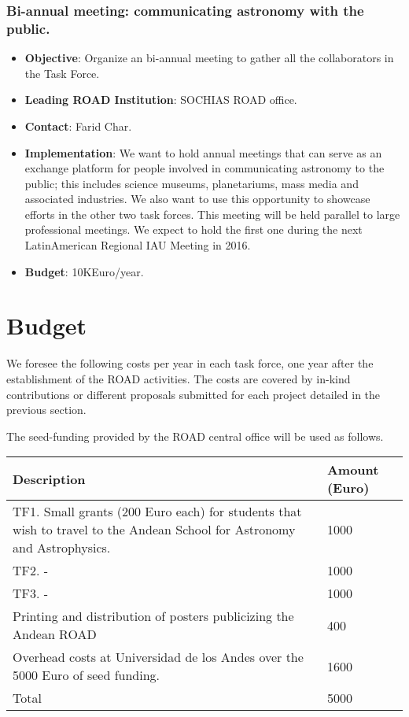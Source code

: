 \documentclass[12pt]{article}
\begin{document}
\subsubsection{Bi-annual meeting: communicating astronomy with the
  public.}
\begin{itemize}
\item {\bf Objective}: Organize an bi-annual meeting to gather all the
  collaborators in the Task Force.
\item {\bf Leading ROAD Institution}: SOCHIAS ROAD office.
\item {\bf Contact}: Farid Char.
\item {\bf Implementation}: We want to hold annual meetings that can
  serve as an exchange platform for people involved in communicating
  astronomy to the public; this includes science museums,
  planetariums, mass media and associated industries. We also want to use
  this opportunity to showcase efforts in the other two task
  forces. This meeting will be held parallel to large professional
  meetings. We expect to hold the first one during the next LatinAmerican
  Regional IAU Meeting in 2016. 
\item {\bf Budget}: 10KEuro/year.
\end{itemize}




\section{Budget}

We foresee the following costs per year in each task force, one year
after the establishment of the ROAD activities. The costs are covered
by in-kind contributions or different proposals submitted for each
project detailed in the previous section. 

The seed-funding provided by the ROAD central office will be used as follows.


\begin{center}
\begin{tabular}{|p{11cm} |p{1.5cm}|}\hline\hline
Description &Amount (Euro) \\\hline
TF1. Small grants (200 Euro each) for students that wish to travel to
the Andean School for Astronomy and Astrophysics. & 1000\\\hline
TF2. - & 1000\\\hline
TF3. - & 1000\\\hline 
Printing and distribution of posters publicizing the Andean ROAD
&400 \\\hline 
Overhead costs at Universidad de los Andes over the 5000 Euro of seed
funding. & 1600\\\hline 
Total &5000\\\hline\hline
\end{tabular}
\end{center}
\end{document}
